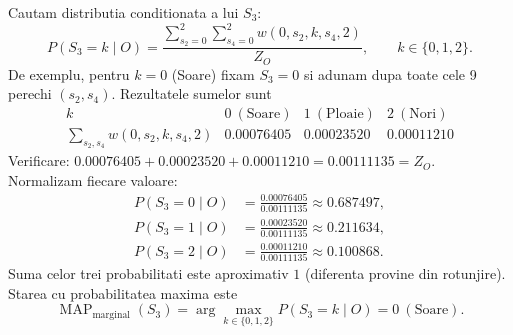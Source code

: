 \documentclass[11pt,a4paper]{article}
\begin{document}
Cautam distributia conditionata a lui $S_3$:
\[
\boxed{P(S_3=k\mid O)=\frac{\displaystyle\sum_{s_2=0}^{2}\sum_{s_4=0}^{2}w(0,s_2,k,s_4,2)}{Z_O}},\qquad k\in\{0,1,2\}.
\]
De exemplu, pentru $k=0$ (Soare) fixam $S_3=0$ si adunam dupa toate cele 9 perechi $(s_2,s_4)$. Rezultatele sumelor sunt
\[
\begin{array}{c|ccc}
k &0\ (\mathrm{Soare})&1\ (\mathrm{Ploaie})&2\ (\mathrm{Nori})\\\hline
\displaystyle\sum_{s_2,s_4}w(0,s_2,k,s_4,2)
&0.00076405&0.00023520&0.00011210
\end{array}
\]
Verificare: $0.00076405+0.00023520+0.00011210=0.00111135=Z_O$. Normalizam fiecare valoare:
\begin{align*}
P(S_3=0\mid O)&=\frac{0.00076405}{0.00111135}\approx0.687497,\\
P(S_3=1\mid O)&=\frac{0.00023520}{0.00111135}\approx0.211634,\\
P(S_3=2\mid O)&=\frac{0.00011210}{0.00111135}\approx0.100868.
\end{align*}
Suma celor trei probabilitati este aproximativ $1$ (diferenta provine din rotunjire). Starea cu probabilitatea maxima este
\[
\boxed{\operatorname{MAP}_{\mathrm{marginal}}(S_3)=\arg\max_{k\in\{0,1,2\}}P(S_3=k\mid O)=0\ (\mathrm{Soare})}.
\]
\end{document}
